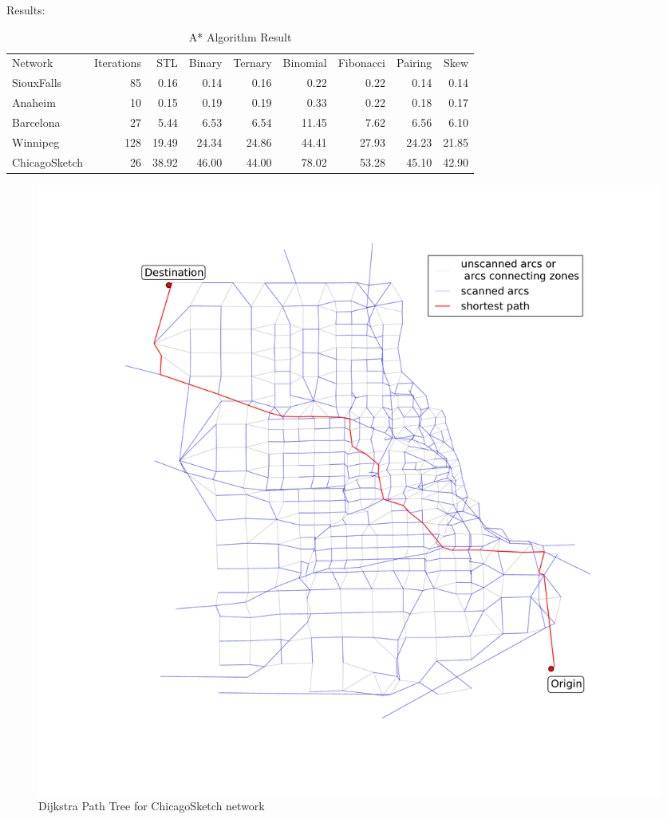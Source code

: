 Results:
\begin{table}[H]
    \centering
    \begin{tabular}{lrr rrr rrr}
        Network        & Iterations & STL & Binary & Ternary & Binomial & Fibonacci & Pairing & Skew \\
        SiouxFalls     & 85           & 0.16 & 0.14 & 0.16 & 0.22  & 0.22  & 0.14  & 0.14            \\
        Anaheim        & 10           & 0.15 & 0.19 & 0.19 & 0.33  & 0.22  & 0.18  & 0.17            \\
        Barcelona      & 27           & 5.44 & 6.53 & 6.54 & 11.45 & 7.62  & 6.56  & 6.10            \\
        Winnipeg       & 128          & 19.49& 24.34& 24.86& 44.41 & 27.93 & 24.23 & 21.85           \\ 
        ChicagoSketch  & 26           & 38.92& 46.00   & 44.00   & 78.02 & 53.28 & 45.10 & 42.90       
    \end{tabular}
    \caption{A* Algorithm Result}
    \label{table:astarresult}
\end{table}


\begin{figure}
    \includegraphics[width=\textwidth,trim=120px 120px 48px 120px,clip]{img/chicago_dijkstra}
    \caption{Dijkstra Path Tree for ChicagoSketch network}
    \label{fig:astarchicago}
\end{figure}

